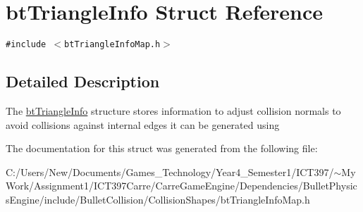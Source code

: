 \hypertarget{structbt_triangle_info}{
\section{btTriangleInfo Struct Reference}
\label{structbt_triangle_info}
}
{\tt \#include $<$btTriangleInfoMap.h$>$}



\subsection{Detailed Description}
The \hyperlink{structbt_triangle_info}{btTriangleInfo} structure stores information to adjust collision normals to avoid collisions against internal edges it can be generated using 

The documentation for this struct was generated from the following file:\begin{CompactItemize}
\item 
C:/Users/New/Documents/Games\_\-Technology/Year4\_\-Semester1/ICT397/$\sim$My Work/Assignment1/ICT397Carre/CarreGameEngine/Dependencies/BulletPhysicsEngine/include/BulletCollision/CollisionShapes/btTriangleInfoMap.h\end{CompactItemize}
